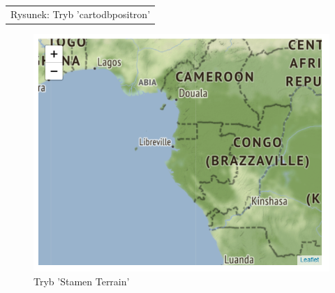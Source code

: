 \documentclass{article}
\begin{document}
\begin{center}
\begin{tabular}{c}
\\Rysunek: Tryb 'cartodbpositron'
\end{tabular}
\end{center}
\newpage

\begin{figure}[h] 
\begin{center}
\includegraphics[scale = 0.75]{"mapaST.PNG"}
\end{center}
\caption{Tryb 'Stamen Terrain'}
\label{}
\end{figure}
\end{document}
